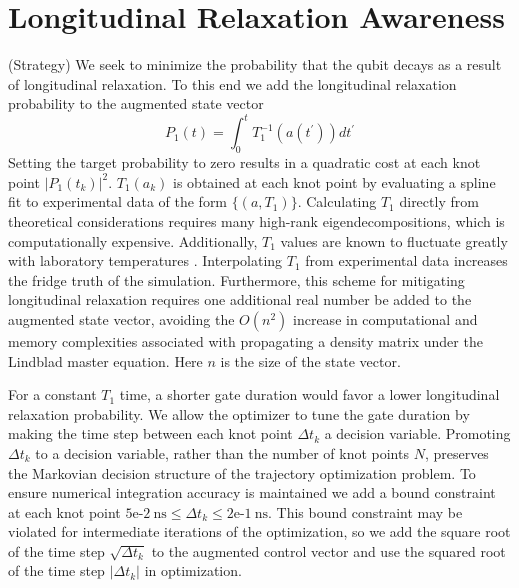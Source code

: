 \documentclass[
  amsfonts,
  amsmath,
  tbtags,
  amssymb,
  aps,
  nobibnotes,
  twocolumn,
  superscriptaddress,
]{revtex4-2}
\begin{document}
\section{Longitudinal Relaxation Awareness}
(Strategy) We seek to minimize the probability
that the qubit decays as a result of longitudinal
relaxation. To this end we add the
longitudinal relaxation probability
to the augmented state vector
\begin{equation}
  P_{1}(t) = \int_{0}^{t} T_{1}^{-1}(a(t^{\prime})) dt^{\prime}
\end{equation}
Setting the target
probability to zero results in
a quadratic cost at each knot point
${\lvert P_{1}(t_{k}) \rvert}^{2}$.
$T_{1}(a_{k})$ is obtained at each knot point by evaluating
a spline fit to
experimental data of the form
$\{(a, T_{1})\}$.
Calculating $T_{1}$ directly from theoretical
considerations requires many high-rank
eigendecompositions, which
is computationally expensive. Additionally,
$T_{1}$ values are known to fluctuate greatly
with laboratory temperatures \cite{klimov2018fluctuations}.
Interpolating $T_{1}$ from experimental data increases
the fridge truth of the simulation. Furthermore, this scheme for mitigating
longitudinal relaxation requires one
additional real number be added to the augmented state vector, avoiding
the $O(n^{2})$ increase in computational and memory complexities
associated with propagating a density matrix under the Lindblad
master equation. Here $n$ is the size of the state vector.

For a constant $T_{1}$ time, a shorter gate duration would
favor a lower longitudinal relaxation probability.
We allow the optimizer to tune the gate duration by
making the time step between each knot point $\Delta t_{k}$
a decision variable.
Promoting $\Delta t_{k}$ to a decision variable, rather
than the number of knot points $N$, preserves the
Markovian decision structure of the trajectory
optimization problem. To ensure numerical
integration accuracy is maintained we add a bound
constraint at each knot point
$5\textrm{e-}2 \ \textrm{ns} \le
\Delta t_{k} \le 2\textrm{e-}1 \ \textrm{ns}$.
This bound constraint may be
violated for intermediate iterations of the optimization,
so we add the square root of the time step $\sqrt{\Delta t_{k}}$
to the augmented control vector and use the squared root
of the time step $\lvert \Delta t_{k} \rvert$ in optimization.
\end{document}

